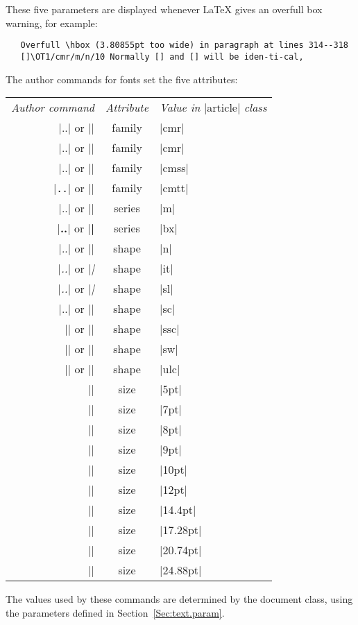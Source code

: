 \documentclass{ltxguide}[1995/11/28]
\begin{document}
These five parameters are displayed whenever \LaTeX{} gives an overfull
box warning, for example:
\begin{verbatim}
   Overfull \hbox (3.80855pt too wide) in paragraph at lines 314--318
   []\OT1/cmr/m/n/10 Normally [] and [] will be iden-ti-cal,
\end{verbatim}
The author commands for fonts set the five attributes:
\begin{center}
  \begin{tabular}{rcl}
    \emph{Author command} & \emph{Attribute}
                          & \emph{Value in} |article| \emph{class} \\
    |\textnormal{..}| or |\normalfont| & family & |cmr|     \\
    |\textrm{..}| or |\rmfamily|       & family & |cmr|     \\
    |\textsf{..}| or |\sffamily|       & family & |cmss|    \\
    |\texttt{..}| or |\ttfamily|       & family & |cmtt|    \\
    |\textmd{..}| or |\mdseries|       & series & |m|       \\
    |\textbf{..}| or |\bfseries|       & series & |bx|      \\
    |\textup{..}| or |\upshape|        & shape  & |n|       \\
    |\textit{..}| or |\itshape|        & shape  & |it|      \\
    |\textsl{..}| or |\slshape|        & shape  & |sl|      \\
    |\textsc{..}| or |\scshape|        & shape  & |sc|      \\
    |\textssc{..}| or |\sscshape|      & shape  & |ssc|     \\
    |\textsw{..}| or |\swshape|        & shape  & |sw|      \\
    |\textulc{..}| or |\ulcshape|      & shape  & |ulc|     \\
    |\tiny|                            & size   & |5pt|     \\
    |\scriptsize|                      & size   & |7pt|     \\
    |\footnotesize|                    & size   & |8pt|     \\
    |\small|                           & size   & |9pt|     \\
    |\normalsize|                      & size   & |10pt|    \\
    |\large|                           & size   & |12pt|    \\
    |\Large|                           & size   & |14.4pt|  \\
    |\LARGE|                           & size   & |17.28pt| \\
    |\huge|                            & size   & |20.74pt| \\
    |\Huge|                            & size   & |24.88pt|
  \end{tabular}
\end{center}
The values used by these commands are determined by the document class,
using the parameters defined in Section~\ref{Sec:text.param}.
\end{document}
